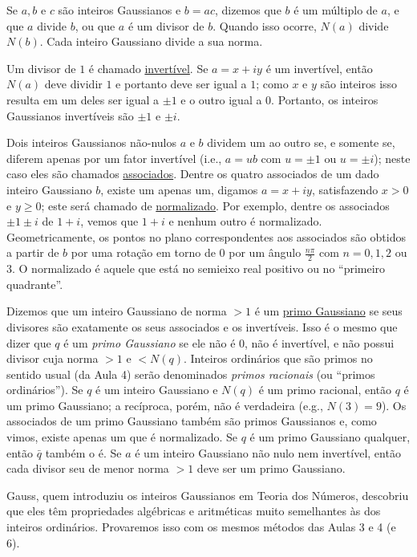 Se $a, b$ e $c$ são inteiros Gaussianos e $b = ac$, dizemos que $b$ é um
múltiplo de $a$, e que $a$ divide $b$, ou que $a$ é um divisor de $b$.
Quando isso ocorre, $N(a)$ divide $N(b)$. Cada inteiro Gaussiano divide
a sua norma.

Um divisor de $1$ é chamado \underline{invertível}. Se $a = x + iy$ é um
invertível, então $N(a)$ deve dividir $1$ e portanto deve ser igual a
$1$; como $x$ e $y$ são inteiros isso resulta em um deles ser igual a
$\pm 1$ e o outro igual a $0$. Portanto, os inteiros Gaussianos
invertíveis são $\pm 1$ e $\pm i$.

Dois inteiros Gaussianos não-nulos $a$ e $b$ dividem um ao outro se, e
somente se, diferem apenas por um fator invertível (i.e., $a = ub$ com
$u = \pm 1$ ou $u = \pm i$); neste caso eles são chamados
\underline{associados}. Dentre os quatro associados de um dado inteiro
Gaussiano $b$, existe um apenas um, digamos $a = x + iy$, satisfazendo
$x > 0$ e $y \ge 0$; este será chamado de \underline{normalizado}. Por exemplo,
dentre os associados $\pm 1 \pm i$ de $1 + i$, vemos que $1 + i$ e
nenhum outro é normalizado. Geometricamente, os pontos no plano
correspondentes aos associados são obtidos a partir de $b$ por uma
rotação em torno de $0$ por um ângulo $\frac{n\pi}{2}$ com $n = 0, 1, 2$
ou $3$. O normalizado é aquele que está no semieixo real positivo ou no
``primeiro quadrante''.

Dizemos que um inteiro Gaussiano de norma $> 1$ é um \underline{primo
Gaussiano} se seus divisores são exatamente os seus associados e os
invertíveis. Isso é o mesmo que dizer que $q$ é um \emph{primo Gaussiano} se ele não é $0$, não é
invertível, e não possui divisor cuja norma $> 1$ e $< N(q)$.
Inteiros ordinários que são primos no sentido usual (da Aula 4) serão
denominados \emph{primos racionais} (ou ``primos ordinários'').
Se $q$ é um inteiro Gaussiano e $N(q)$ é um primo racional, então $q$ é
um primo Gaussiano; a recíproca, porém, não é verdadeira (e.g.,
$N(3) = 9$). Os associados de um primo Gaussiano também são primos
Gaussianos e, como vimos, existe apenas um que é normalizado. Se $q$ é
um primo Gaussiano qualquer, então $\bar{q}$ também o é. Se $a$ é um
inteiro Gaussiano não nulo nem invertível, então cada divisor seu de
menor norma $> 1$ deve ser um primo Gaussiano.

Gauss, quem introduziu os inteiros Gaussianos em Teoria dos Números,
descobriu que eles têm propriedades algébricas e aritméticas muito
semelhantes às dos inteiros ordinários. Provaremos isso com os mesmos
métodos das Aulas 3 e 4 (e 6).

